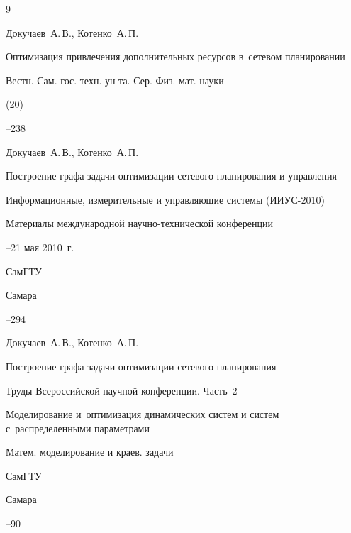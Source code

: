 \vspace{-2mm}



\begin{thebibliography}{9}


\by Докучаев~А.\,В., Котенко~А.\,П.

\paper Оптимизация привлечения дополнительных ресурсов в~сетевом планировании

\jour Вестн. Сам. гос. техн. ун-та. Сер. Физ.-мат. науки


(20)

--238




\by Докучаев~А.\,В., Котенко~А.\,П.

\paper Построение графа задачи оптимизации сетевого планирования и управления

\inbook Информационные, измерительные и управляющие системы (ИИУС-2010)

\bookinfo Материалы международной научно-технической конференции

--21 мая 2010~г. 

\publ СамГТУ

\publaddr Самара


--294




\by Докучаев~А.\,В., Котенко~А.\,П.

\paper Построение графа задачи оптимизации сетевого планирования

\inbook Труды Всероссийской научной конференции. Часть~2

\bookinfo Моделирование и~оптимизация динамических систем и систем с~распределенными параметрами

\serial Матем. моделирование и краев. задачи


\publ СамГТУ

\publaddr Самара

--90





\end{thebibliography}



\vspace{-13mm}





\makeengtitle




%




%

